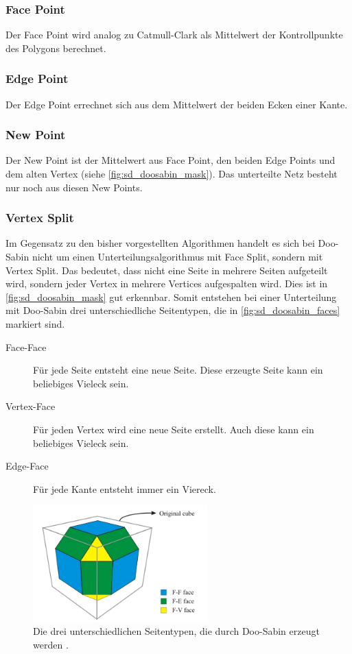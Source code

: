 \subsubsection*{Face Point}
Der Face Point wird analog zu Catmull-Clark als Mittelwert der Kontrollpunkte des Polygons
berechnet.

\subsubsection*{Edge Point}
Der Edge Point errechnet sich aus dem Mittelwert der beiden Ecken einer Kante.

\subsubsection*{New Point}
Der New Point ist der Mittelwert aus Face Point, den beiden Edge Points und dem alten Vertex
(siehe \autoref{fig:sd_doosabin_mask}). Das unterteilte Netz besteht nur noch aus diesen New Points.

\subsubsection*{Vertex Split}
Im Gegensatz zu den bisher vorgestellten Algorithmen handelt es sich bei Doo-Sabin nicht um einen
Unterteilungsalgorithmus mit Face Split, sondern mit Vertex Split.
Das bedeutet, dass nicht eine Seite in mehrere Seiten aufgeteilt wird, sondern
jeder Vertex in mehrere Vertices aufgespalten wird.
Dies ist in \autoref{fig:sd_doosabin_mask} gut erkennbar.
Somit entstehen bei einer Unterteilung mit Doo-Sabin drei unterschiedliche Seitentypen,
die in \autoref{fig:sd_doosabin_faces} markiert sind.
\begin{description}
 \item[Face-Face] Für jede Seite entsteht eine neue Seite.
 Diese erzeugte Seite kann ein beliebiges Vieleck sein.
 \item[Vertex-Face] Für jeden Vertex wird eine neue Seite erstellt.
 Auch diese kann ein beliebiges Vieleck sein.
 \item[Edge-Face] Für jede Kante entsteht immer ein Viereck.
\end{description}
\cite{Yoshihitoyagi.doosabin} \cite{UniCalifornia} \cite{Olsen}

\begin{figure}
\centering
\includegraphics[width=0.6\textwidth]{content/media/sd_doosabin_face_types.jpg}
\caption{Die drei unterschiedlichen Seitentypen, die durch Doo-Sabin erzeugt werden \cite{Olsen}.}
\label{fig:sd_doosabin_faces}
\end{figure}



